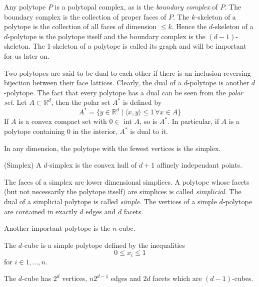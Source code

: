 Any polytope $P$ is a polytopal complex, as is the \textit{boundary complex} of 
$P$. The boundary complex is the collection of proper faces of $P$.
The $k$-skeleton of a polytope is the collection of all faces of dimension $\leq 
k$. Hence the $d$-skeleton of a $d$-polytope is the polytope itself and the 
boundary complex is the $(d-1)$-skeleton. The 1-skeleton of a polytope is called 
its graph and will be important for us later on.


Two polytopes are said to be dual to each other if there is an inclusion 
reversing bijection between their face lattices. Clearly, the dual of a 
$d$-polytope is another $d$-polytope. The fact that every polytope has a dual 
can be seen from the \textit{polar set}. Let $A\subset \mathbb{R}^d$, then the 
polar set $A^*$ is defined by
\begin{equation}
 A^* = \{y \in \mathbb{R}^d \mid \langle x,y\rangle \leq 1 \, \forall  x  \in A 
\} 
\end{equation}
If $A$ is a convex compact set with $0 \in$ int $A$, so is $A^*$. In 
particular, if $A$ is a polytope containing $0$ in the interior, $A^*$ is dual 
to it. 

In any dimension, the polytope with the fewest vertices is the simplex. 
\begin{definition}
 (Simplex) A $d$-simplex is the convex hull of $d+1$ affinely independant 
points.
\end{definition}
The faces of a simplex are lower dimensional simplices. A polytope whose facets 
(but not necessarily the polytope itself) are simplices is called 
\textit{simplicial}. The dual of a simplicial polytope is called 
\textit{simple}. The vertices of a simple $d$-polytope are contained in exactly 
$d$ edges and $d$ facets. 

Another important polytope is the $n$-cube.

\begin{definition}
 The $d$-cube is a simple polytope defined by the inequalities
\begin{equation}
 0 \leq x_i \leq 1 
\end{equation}
for $i \in 1,\dots, n$.
\end{definition}
The $d$-cube has $2^d$ vertices, $n2^{d-1}$ edges and $2d$ facets which
are $(d-1)$-cubes.

